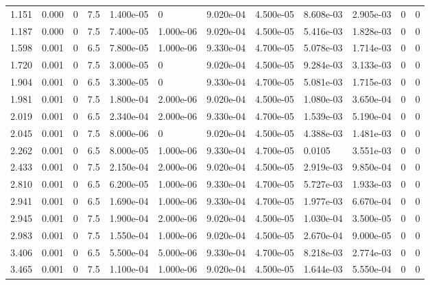 \documentclass[preview]{standalone}
\begin{document}
{{\begin{tabular}{L{1.2cm}C{1.2cm} C{0.3cm}C{0.5cm} C{1.4cm}C{1.4cm} C{1.4cm}C{1.4cm} C{1.6cm}C{1.6cm} C{1.6cm}C{1.6cm}}
  1.151  &  0.000  & 0     & 7.5 &  1.400e-05  & 0  &  9.020e-04&   4.500e-05& 8.608e-03 & 2.905e-03   &  0 & 0  \\ 
  1.187  &  0.000  & 0     & 7.5 &  7.400e-05  & 1.000e-06  &  9.020e-04&   4.500e-05& 5.416e-03 & 1.828e-03   &  0 & 0  \\ 
  1.598  &  0.001  & 0     & 6.5 &  7.800e-05  & 1.000e-06  &  9.330e-04&   4.700e-05& 5.078e-03 & 1.714e-03   &  0 & 0  \\ 
  1.720  &  0.001  & 0     & 7.5 &  3.000e-05  & 0  &  9.020e-04&   4.500e-05& 9.284e-03 & 3.133e-03   &  0 & 0  \\ 
  1.904  &  0.001  & 0     & 6.5 &  3.300e-05  & 0  &  9.330e-04&   4.700e-05& 5.081e-03 & 1.715e-03   &  0 & 0  \\ 
  1.981  &  0.001  & 0     & 7.5 &  1.800e-04  & 2.000e-06  &  9.020e-04&   4.500e-05& 1.080e-03 & 3.650e-04   &  0 & 0  \\ 
  2.019  &  0.001  & 0     & 6.5 &  2.340e-04  & 2.000e-06  &  9.330e-04&   4.700e-05& 1.539e-03 & 5.190e-04   &  0 & 0  \\ 
  2.045  &  0.001  & 0     & 7.5 &  8.000e-06  & 0  &  9.020e-04&   4.500e-05& 4.388e-03 & 1.481e-03   &  0 & 0  \\ 
  2.262  &  0.001  & 0     & 6.5 &  8.000e-05  & 1.000e-06  &  9.330e-04&   4.700e-05& 0.0105 & 3.551e-03   &  0 & 0  \\ 
  2.433  &  0.001  & 0     & 7.5 &  2.150e-04  & 2.000e-06  &  9.020e-04&   4.500e-05& 2.919e-03 & 9.850e-04   &  0 & 0  \\ 
  2.810  &  0.001  & 0     & 6.5 &  6.200e-05  & 1.000e-06  &  9.330e-04&   4.700e-05& 5.727e-03 & 1.933e-03   &  0 & 0  \\ 
  2.941  &  0.001  & 0     & 6.5 &  1.690e-04  & 1.000e-06  &  9.330e-04&   4.700e-05& 1.977e-03 & 6.670e-04   &  0 & 0  \\ 
  2.945  &  0.001  & 0     & 7.5 &  1.900e-04  & 2.000e-06  &  9.020e-04&   4.500e-05& 1.030e-04 & 3.500e-05   &  0 & 0  \\ 
  2.983  &  0.001  & 0     & 7.5 &  1.550e-04  & 1.000e-06  &  9.020e-04&   4.500e-05& 2.670e-04 & 9.000e-05   &  0 & 0  \\ 
  3.406  &  0.001  & 0     & 6.5 &  5.500e-04  & 5.000e-06  &  9.330e-04&   4.700e-05& 8.218e-03 & 2.774e-03   &  0 & 0  \\ 
  3.465  &  0.001  & 0     & 7.5 &  1.100e-04  & 1.000e-06  &  9.020e-04&   4.500e-05& 1.644e-03 & 5.550e-04   &  0 & 0  \\ 

\end{tabular}}}
\end{document}
